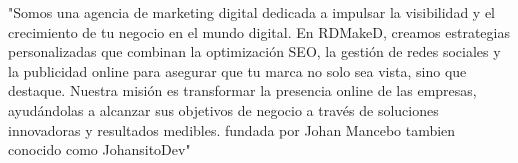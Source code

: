 "Somos una agencia de marketing digital dedicada a impulsar la visibilidad y el crecimiento de tu negocio en el mundo digital. En RDMakeD, creamos estrategias personalizadas que combinan la optimización SEO, la gestión de redes sociales y la publicidad online para asegurar que tu marca no solo sea vista, sino que destaque. Nuestra misión es transformar la presencia online de las empresas, ayudándolas a alcanzar sus objetivos de negocio a través de soluciones innovadoras y resultados medibles. fundada por Johan Mancebo tambien conocido como JohansitoDev"
